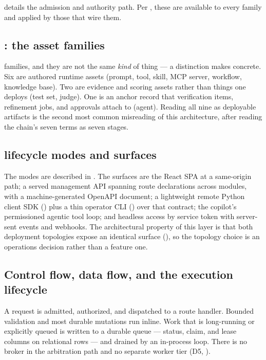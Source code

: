 

\noindent{} details the admission and authority path. Per
, these are available to every family and applied by those
that wire them.

\subsection{: the asset families}

\statFamiliesC{} families, and they are not the same \emph{kind} of thing --- a
distinction  makes concrete. Six are authored runtime assets
(prompt, tool, skill, MCP server, workflow, knowledge base). Two are evidence and
scoring assets rather than things one deploys (test set, judge). One is an anchor
record that verification items, refinement jobs, and approvals attach to (agent).
Reading all nine as deployable artifacts is the second most common misreading of
this architecture, after reading the chain's seven terms as seven stages.

\subsection{ lifecycle modes and  surfaces}

The modes are described in . The surfaces are the React SPA
at a same-origin path; a served management API spanning \statRouteDecls{} route
declarations across \statRouteModules{} modules, with a machine-generated OpenAPI
document; a lightweight remote Python client SDK
() plus a thin operator CLI () over that
contract; the \aria{} copilot's permissioned agentic tool loop; and headless
access by service token with server-sent events and webhooks. The architectural
property of this layer is that both deployment topologies expose an identical
surface (), so the topology choice is an operations
decision rather than a feature one.

\subsection{Control flow, data flow, and the execution lifecycle}
\label{sec:exec}




 A request is admitted, authorized, and dispatched to a route
handler. Bounded validation and most durable mutations run inline. Work that is
long-running or explicitly queued is written to a durable queue --- status, claim,
and lease columns on relational rows --- and drained by an in-process loop. There
is no broker in the arbitration path and no separate worker tier (D5,
).

